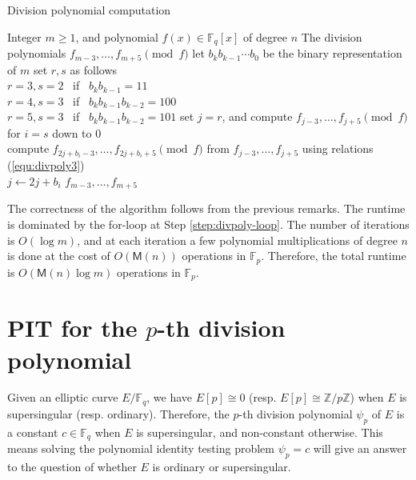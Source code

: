 \documentclass[review]{elsarticle}
\theoremstyle{plain}
\theoremstyle{definition}
\def\Z{\ensuremath{\mathbb{Z}}}
\def\F{\ensuremath{\mathbb{F}}}
\def\MM{\ensuremath{\mathsf{M}}}
\begin{document}
\begin{algorithm}[H]
	\caption{Division polynomial computation}
	\label{alg:divpoly-comp}
	\begin{algorithmic}[1]
		\REQUIRE Integer $m \ge 1$, and polynomial $f(x) \in \F_q[x]$ of degree $n$
		\ENSURE The division polynomials $f_{m - 3}, \dots, f_{m + 5} \pmod{f}$
		\STATE let $b_kb_{k - 1} \cdots b_0$ be the binary representation of $m$
		\STATE set $r, s$ as follows \\
		$r = 3, s = 2$~ if~ $b_kb_{k - 1} = 11$ \\
		$r = 4, s = 3$~ if~ $b_kb_{k - 1}b_{k - 2} = 100$ \\
		$r = 5, s = 3$~ if~ $b_kb_{k - 1}b_{k - 2} = 101$
		\STATE set $j = r$, and compute $f_{j - 3}, \dots, f_{j + 5} \pmod{f}$
		\STATE\label{step:divpoly-loop} for $i = s$ down to $0$ \\
		compute $f_{2j + b_i - 3}, \dots, f_{2j + b_i + 5} \pmod{f}$ from $f_{j - 3}, \dots, f_{j + 
		5}$ using relations (\ref{equ:divpoly3}) \\
		$j \leftarrow 2j + b_i$
		\RETURN $f_{m - 3}, \dots, f_{m + 5}$
	\end{algorithmic}
\end{algorithm}

The correctness of the algorithm follows from the previous remarks. The runtime is dominated by 
the for-loop at Step \ref{step:divpoly-loop}. The number of iterations is $O(\log m)$, and at each 
iteration a few polynomial multiplications of degree $n$ is done at the cost of $O(\MM(n))$ 
operations in $\F_p$. Therefore, the total runtime is $O(\MM(n)\log m)$ operations in $\F_p$.




\section{PIT for the $p$-th division polynomial}
\label{sec:pit-for-div}

Given an elliptic curve $E/\F_q$, we have $E[p] \cong 0$ (resp. $E[p] \cong \Z / p\Z$) when $E$ is 
supersingular (resp. ordinary). Therefore, the $p$-th division polynomial $\psi_p$ of $E$ is a 
constant $c \in \F_q$ when $E$ is supersingular, and non-constant otherwise. This means solving the 
polynomial identity testing problem $\psi_p = c$ will give an answer to the question of whether $E$ 
is ordinary or supersingular. 
\end{document}
